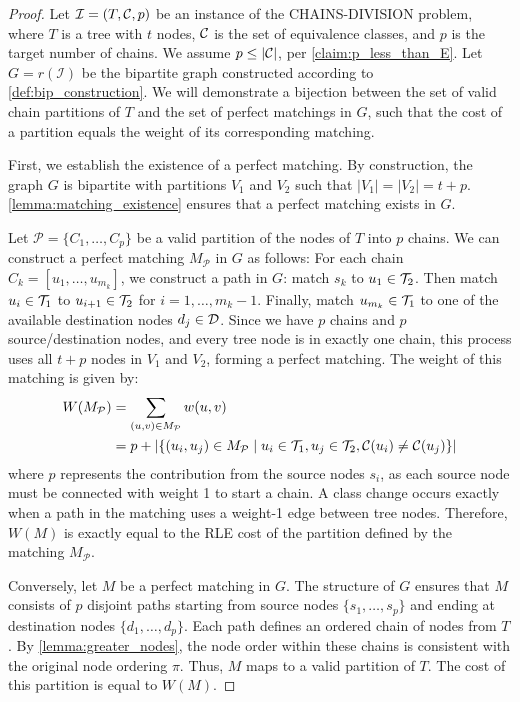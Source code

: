 \begin{proof}
    Let $\mathcal{I} = (T, \mathcal{C}, p)$ be an instance of the \textsc{CHAINS-DIVISION} problem, where $T$ is a tree with $t$ nodes, $\mathcal{C}$ is the set of equivalence classes, and $p$ is the target number of chains. We assume $p \leq |\mathcal{C}|$, per \cref{claim:p_less_than_E}. Let $G = r(\mathcal{I})$ be the bipartite graph constructed according to \cref{def:bip_construction}. We will demonstrate a bijection between the set of valid chain partitions of $T$ and the set of perfect matchings in $G$, such that the cost of a partition equals the weight of its corresponding matching.

    First, we establish the existence of a perfect matching. By construction, the graph $G$ is bipartite with partitions $V_1$ and $V_2$ such that $|V_1| = |V_2| = t+p$. \cref{lemma:matching_existence} ensures that a perfect matching exists in $G$.

    Let $\mathcal{P} = \{C_1, \dots, C_p\}$ be a valid partition of the nodes of $T$ into $p$ chains. We can construct a perfect matching $M_\mathcal{P}$ in $G$ as follows:  For each chain $C_k = [u_{1}, \dots, u_{m_k}]$, we construct a path in $G$: match $s_k$ to $u_{1} \in \mathcal{T}_{2}$. Then match $u_{i} \in \mathcal{T}_{1}$ to $u_{i+1} \in \mathcal{T}_{2}$ for $i=1, \dots, m_k-1$. Finally, match $u_{m_k} \in \mathcal{T}_{1}$ to one of the available destination nodes $d_j \in \mathcal{D}$. Since we have $p$ chains and $p$ source/destination nodes, and every tree node is in exactly one chain, this process uses all $t+p$ nodes in $V_1$ and $V_2$, forming a perfect matching. The weight of this matching is given by:
    \begin{align*}
        W(M_\mathcal{P}) &= \sum_{(u,v) \in M_\mathcal{P}} w(u,v) \\
        &= p + |\{ (u_i, u_j) \in M_\mathcal{P} \mid u_i \in \mathcal{T}_{1}, u_j \in \mathcal{T}_{2}, \mathcal{C}(u_i) \neq \mathcal{C}(u_j) \}|
    \end{align*}
    where $p$ represents the contribution from the source nodes $s_i$, as each source node must be connected with weight 1 to start a chain. A class change occurs exactly when a path in the matching uses a weight-1 edge between tree nodes.
    Therefore, $W(M)$ is exactly equal to the RLE cost of the partition defined by the matching $M_\mathcal{P}$.

    Conversely, let $M$ be a perfect matching in $G$. The structure of $G$ ensures that $M$ consists of $p$ disjoint paths starting from source nodes $\{s_1, \dots, s_p\}$ and ending at destination nodes $\{d_1, \dots, d_p\}$. Each path defines an ordered chain of nodes from $T$. By \cref{lemma:greater_nodes}, the node order within these chains is consistent with the original node ordering $\pi$. Thus, $M$ maps to a valid partition of $T$. The cost of this partition is equal to $W(M)$.


\end{proof}
